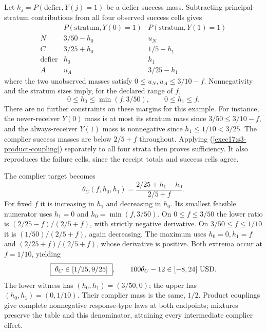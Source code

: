 Let $h_j=P(\text{defier},Y(j)=1)$ be a defier success mass. Subtracting
principal-stratum contributions from all four observed success cells gives
\[
\begin{array}{c|cc}
 &P(\text{stratum},Y(0)=1)&P(\text{stratum},Y(1)=1)\\ \hline
 N&3/50-h_0&u_N\\
 C&3/25+h_0&1/5+h_1\\
 \text{defier}&h_0&h_1\\
 A&u_A&3/25-h_1
\end{array}
\]
where the two unobserved masses satisfy
$0\leq u_N,u_A\leq3/10-f$. Nonnegativity and the stratum sizes imply,
for the declared range of $f$,
\begin{equation}
 0\leq h_0\leq\min(f,3/50),\qquad 0\leq h_1\leq f .
 \label{exec17:s3-defier-feasible}
\end{equation}
There are no further constraints on these margins for this example.
For instance, the never-receiver $Y(0)$ mass is at most its stratum
mass since $3/50\leq3/10-f$, and the always-receiver $Y(1)$ mass
is nonnegative since $h_1\leq1/10<3/25$.
The complier success masses are below $2/5+f$ throughout.
Applying (\ref{exec17:s3-product-coupling}) separately to all four
strata then proves sufficiency. It also reproduces the failure cells,
since the receipt totals and success cells agree.

The complier target becomes
\begin{equation}
 \theta_C(f,h_0,h_1)
 =\frac{2/25+h_1-h_0}{2/5+f}.
 \label{exec17:s3-defier-ratio}
\end{equation}
For fixed $f$ it is increasing in $h_1$ and decreasing in $h_0$.
Its smallest feasible numerator uses $h_1=0$ and
$h_0=\min(f,3/50)$. On $0\leq f\leq3/50$ the lower ratio is
$(2/25-f)/(2/5+f)$, with strictly negative derivative.
On $3/50\leq f\leq1/10$ it is
$(1/50)/(2/5+f)$, again decreasing.
The maximum uses $h_0=0,h_1=f$ and
$(2/25+f)/(2/5+f)$, whose derivative is positive.
Both extrema occur at $f=1/10$, yielding
\begin{equation}
 \boxed{\ \theta_C\in[1/25,9/25]\ },\qquad
 100\theta_C-12\in[-8,24]\ {\rm USD}.
 \label{exec17:s3-defier-sharp}
\end{equation}
The lower witness has $(h_0,h_1)=(3/50,0)$; the upper has
$(h_0,h_1)=(0,1/10)$. Their complier mass is the same, $1/2$.
Product couplings give complete nonnegative response-type laws at both
endpoints; mixtures preserve the table and this denominator, attaining
every intermediate complier effect.

